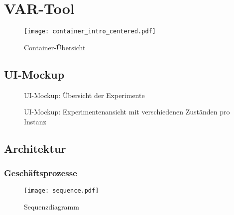 \chapter{VAR-Tool}
\label{ch:main-matter}
  \begin{figure}[H]
    \centering
    \texttt{[image: container\_intro\_centered.pdf]}
    \par
    \caption{Container-Übersicht}
    \label{fig:container-intro}
  \end{figure}
  \blindtext
  \clearpage


\section{UI-Mockup}
\blindtext
\begin{landscape}
  \begin{figure}[h]
    \centering
    \par
    \caption{UI-Mockup: Übersicht der Experimente}
    \label{fig:ui-mockup-1}
  \end{figure}
  \begin{figure}[h]
    \centering
    \par
    \caption{UI-Mockup: Experimentenansicht mit verschiedenen Zuständen pro Instanz}
    \label{fig:ui-mockup-2}
  \end{figure}
\end{landscape}
\section{Architektur}
\blindtext
\subsection{Geschäftsprozesse}
\blindtext
\begin{landscape}
  \begin{figure}[h]
    \centering
    \texttt{[image: sequence.pdf]}
    \par
    \caption{Sequenzdiagramm}
    \label{fig:sequence}
  \end{figure}
\end{landscape}

